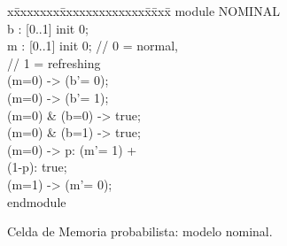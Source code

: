 \begin{figure}[t]
\centering
\begin{minipage}[t]{.47\textwidth}
\fontsize{10}{10}\selectfont\ttfamily
\begin{tabbing}
x\=xxxxxxx\=xxxxxxxxxxxxx\=x\=xxx\= \kill    
module NOMINAL\\[1ex]
\>b : [0..1] init 0;\\
\>m : [0..1] init 0; \>\>// 0 = normal,\\
\>                   \>\>// 1 = refreshing\\[1ex]
\>[w0]   \>(m=0)          \>\>-> \>(b'= 0);\\
\>[w1]   \>(m=0)          \>\>-> \>(b'= 1);\\
\>[r0]   \>(m=0) \& (b=0) \>\>-> \>true;\\
\>[r1]   \>(m=0) \& (b=1) \>\>-> \>true;\\
\>[tick] \>(m=0)          \>\>-> \>p: (m'= 1) +\\
\>       \>               \>\>   \>(1-p): true;\\
\>[rfsh] \>(m=1)          \>\>-> \>(m'= 0);\\[1ex]
endmodule\\[-2em]
\end{tabbing}
 
\end{minipage}
\vspace{2ex}
\caption{Celda de Memoria probabilista: modelo nominal.} \label{fig:exam_1_mem_cell:nom}
\end{figure}


